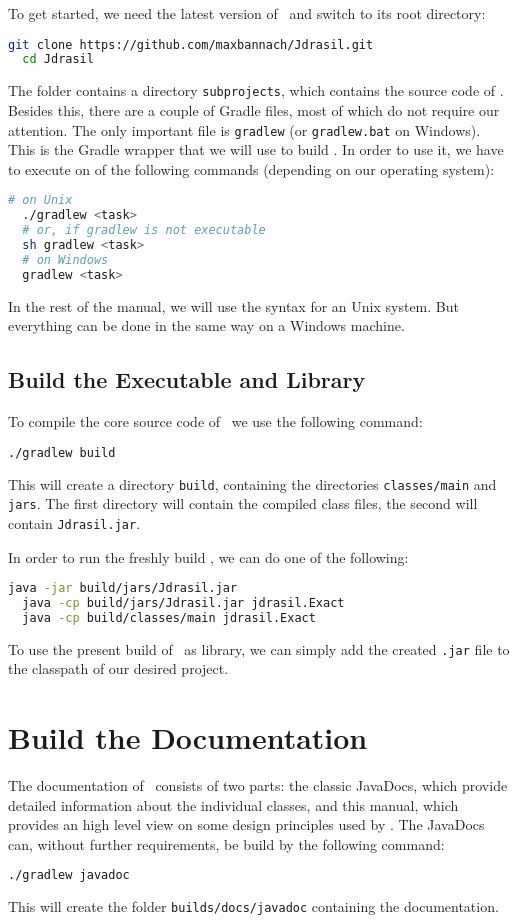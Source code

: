 \documentclass[a4paper, ukenglish, twoside, openright]{jdrasilmanual}
\begin{document}
To get started, we need the latest version of \Jdrasil\ and switch to
its root directory:
\begin{lstlisting}[language=bash]
  git clone https://github.com/maxbannach/Jdrasil.git
  cd Jdrasil
\end{lstlisting}
The folder contains a directory \texttt{subprojects}, which contains
the source code of \Jdrasil. Besides this, there are a couple of Gradle
files, most of which do not require our attention. The only important
file is \lstinline{gradlew} (or \lstinline{gradlew.bat} on
Windows). This is the Gradle wrapper that we will use to build \Jdrasil.
In order to use it, we have to execute on of the following commands
(depending on our operating system):
\begin{lstlisting}[language=bash]
  # on Unix
  ./gradlew <task>
  # or, if gradlew is not executable
  sh gradlew <task>
  # on Windows
  gradlew <task>
\end{lstlisting}
In the rest of the manual, we will use the syntax for an Unix
system. But everything can be done in the same way on a Windows machine.

\subsection{Build the Executable and Library}
To compile the core source code of \Jdrasil\ we use the following
command:
\begin{lstlisting}[language=bash]
  ./gradlew build
\end{lstlisting}
This will create a directory \texttt{build}, containing the
directories \texttt{classes/main} and \texttt{jars}. The first
directory will contain the compiled class files, the second will
contain \texttt{Jdrasil.jar}.

In order to run the freshly build \Jdrasil, we can do one of the
following:
\begin{lstlisting}[language=bash]
  java -jar build/jars/Jdrasil.jar
  java -cp build/jars/Jdrasil.jar jdrasil.Exact
  java -cp build/classes/main jdrasil.Exact
\end{lstlisting}
To use the present build of \Jdrasil\ as library, we can simply add
the created \texttt{.jar} file to the classpath of our desired
project.
\section{Build the Documentation}
The documentation of \Jdrasil\ consists of two parts: the classic
JavaDocs, which provide detailed information about the individual
classes, and this manual, which provides an high level view on some
design principles used by \Jdrasil. The JavaDocs can, without further
requirements, be build by the following command:
\begin{lstlisting}[language=bash]
  ./gradlew javadoc
\end{lstlisting}
This will create the folder \texttt{builds/docs/javadoc} containing
the documentation.
\end{document}
